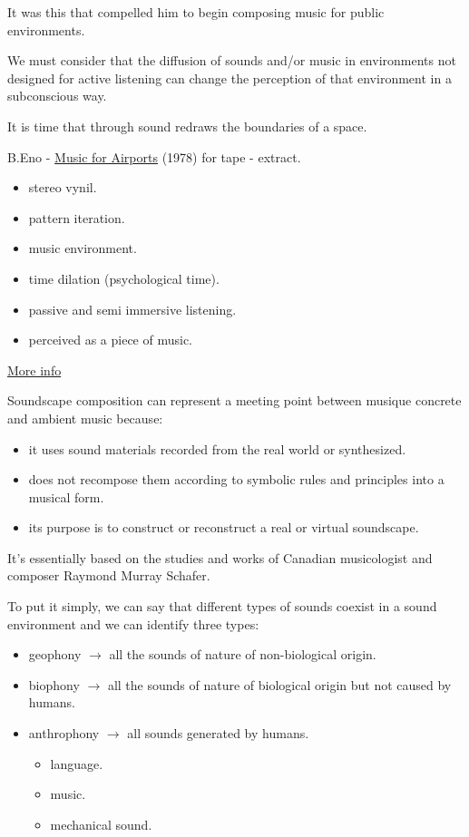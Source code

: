 It was this that compelled him to begin composing music for public environments.

We must consider that the diffusion of sounds and/or music in environments not designed for active listening can change the perception of that environment in a subconscious way.

It is time that through sound redraws the boundaries of a space.

B.Eno - \href{http://www.musicaecodice.it/gitmedia/emc/2_media/eno.mp3}{Music for Airports} (1978) for tape - extract.

\begin{itemize}
\tightlist
\item stereo vynil. 
\item pattern iteration.
\item music environment. 
\item time dilation (psychological time). 
\item passive and semi immersive listening. 
\item perceived as a piece of music.
\end{itemize}

\href{http://www.musicaecodice.it/gitmedia/emc/2_media/eno.pdf}{More info}

Soundscape composition can represent a meeting point between musique concrete and ambient music because:

\begin{itemize}
\tightlist
\item it uses sound materials recorded from the real world or synthesized.
\item does not recompose them according to symbolic rules and principles into a musical form.
\item its purpose is to construct or reconstruct a real or virtual soundscape.
\end{itemize}

It's essentially based on the studies and works of Canadian musicologist and composer Raymond Murray Schafer.

To put it simply, we can say that different types of sounds coexist in a sound environment and we can identify three types:

\begin{itemize}
\tightlist
\item geophony \(\rightarrow\) all the sounds of nature of non-biological origin.
\item biophony \(\rightarrow\) all the sounds of nature of biological origin but not caused by humans.
\item anthrophony \(\rightarrow\) all sounds generated by humans.
  \begin{itemize}
  \tightlist
  \item language.
  \item music.
  \item mechanical sound.
  \end{itemize}
\end{itemize}

